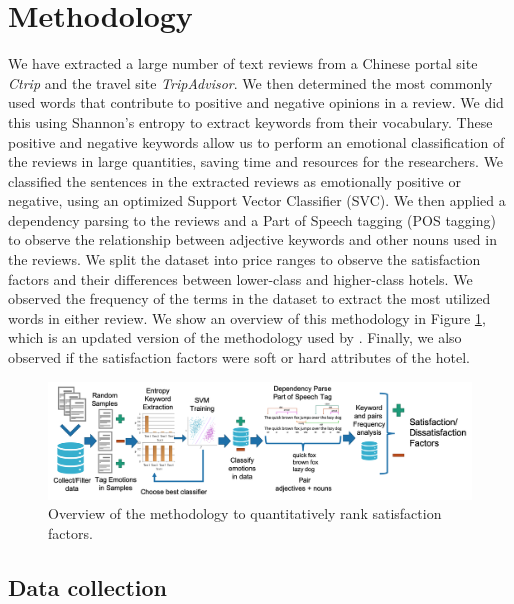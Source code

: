 \documentclass[smallextended,natbib]{svjour3}       %
\begin{document}
\section{Methodology}\label{method}

  We have extracted a large number of text reviews from a Chinese portal site \textit{Ctrip} and the travel site \textit{TripAdvisor}. We then determined the most commonly used words that contribute to positive and negative opinions in a review. We did this using Shannon's entropy to extract keywords from their vocabulary. These positive and negative keywords allow us to perform an emotional classification of the reviews in large quantities, saving time and resources for the researchers. We classified the sentences in the extracted reviews as emotionally positive or negative, using an optimized Support Vector Classifier (SVC). We then applied a dependency parsing to the reviews and a Part of Speech tagging (POS tagging) to observe the relationship between adjective keywords and other nouns used in the reviews. We split the dataset into price ranges to observe the satisfaction factors and their differences between lower-class and higher-class hotels. We observed the frequency of the terms in the dataset to extract the most utilized words in either review. We show an overview of this methodology in Figure \ref{fig:method-overview}, which is an updated version of the methodology used by \cite{Aleman2018ICAROB}. Finally, we also observed if the satisfaction factors were soft or hard attributes of the hotel.

  \begin{figure}[bp]
  \centering
  \includegraphics[width=\textwidth]{emotion-method-overview_V3.png}
  \caption{Overview of the methodology to quantitatively rank satisfaction factors.}
  \label{fig:method-overview}
  \end{figure}

  \subsection{Data collection}\label{datacollection}
\end{document}
